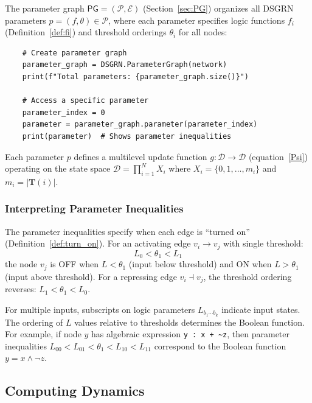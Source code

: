 \documentclass[12pt, notitlepage]{amsart}
\newcommand{\cD}{\mathcal{D}}
\newcommand{\cE}{{\mathcal E}}
\newcommand{\cP}{{\mathcal P}}
\theoremstyle{definition}
\newcommand{\Targets}{\mathbf{T}}
\newcommand{\PG}{\mathsf{PG}}
\begin{document}
    The parameter graph $\PG = (\cP, \cE)$ (Section~\ref{sec:PG}) organizes all DSGRN parameters $p = (f, \theta) \in \cP$, where each parameter specifies logic functions $f_i$ (Definition~\ref{def:fi}) and threshold orderings $\theta_i$ for all nodes:

    \begin{lstlisting}
    # Create parameter graph
    parameter_graph = DSGRN.ParameterGraph(network)
    print(f"Total parameters: {parameter_graph.size()}")

    # Access a specific parameter
    parameter_index = 0
    parameter = parameter_graph.parameter(parameter_index)
    print(parameter)  # Shows parameter inequalities
    \end{lstlisting}

    Each parameter $p$ defines a multilevel update function $g \colon \cD \to \cD$ (equation~\eqref{Psi}) operating on the state space $\cD = \prod_{i=1}^{N} X_i$ where $X_i = \{0, 1, \ldots, m_i\}$ and $m_i = |\Targets(i)|$.

    \subsubsection{Interpreting Parameter Inequalities}

    The parameter inequalities specify when each edge is ``turned on'' (Definition~\ref{def:turn_on}). For an activating edge $v_i \to v_j$ with single threshold:
    \[
    L_0 < \theta_1 < L_1
    \]
    the node $v_j$ is OFF when $L < \theta_1$ (input below threshold) and ON when $L > \theta_1$ (input above threshold). For a repressing edge $v_i \dashv v_j$, the threshold ordering reverses: $L_1 < \theta_1 < L_0$.

    For multiple inputs, subscripts on logic parameters $L_{b_1 \cdots b_k}$ indicate input states. The ordering of $L$ values relative to thresholds determines the Boolean function. For example, if node $y$ has algebraic expression \texttt{y : x + \textasciitilde z}, then parameter inequalities $L_{00} < L_{01} < \theta_1 < L_{10} < L_{11}$ correspond to the Boolean function $y = x \wedge \neg z$.


    \subsection{Computing Dynamics}
\end{document}
